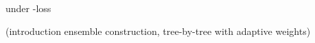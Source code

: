 \documentclass[../main.tex]{subfiles}
\begin{document}









under \zeroone-loss

(introduction ensemble construction, tree-by-tree with adaptive weights)
\end{document}
